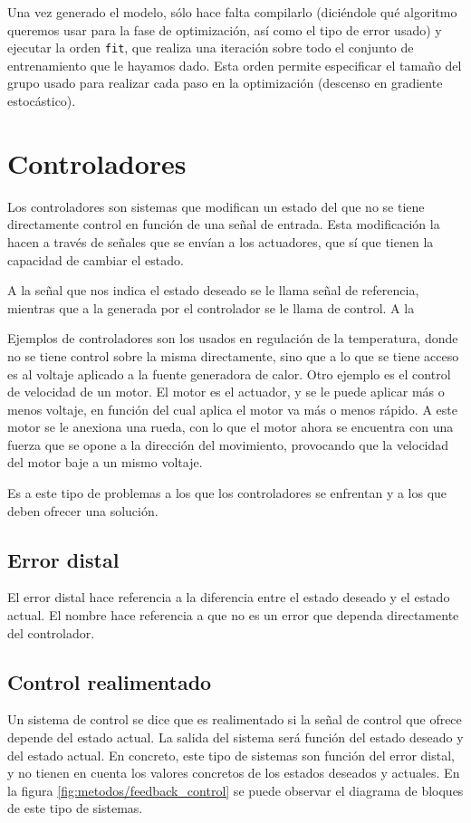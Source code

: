 Una vez generado el modelo, sólo hace falta compilarlo (diciéndole qué algoritmo queremos usar para la fase de optimización, así como el tipo de error usado) y ejecutar la orden \texttt{fit}, que realiza una iteración sobre todo el conjunto de entrenamiento que le hayamos dado. Esta orden permite especificar el tamaño del grupo usado para realizar cada paso en la optimización (descenso en gradiente estocástico).
\section{Controladores}
Los controladores \cite{kulakowski2007dynamic}\cite{brosilow2002techniques}\cite{tolu2013adaptive}\cite{tolu2012bio} son sistemas que modifican un estado del que no se tiene directamente control en función de una señal de entrada. Esta modificación la hacen a través de señales que se envían a los actuadores, que sí que tienen la capacidad de cambiar el estado.

A la señal que nos indica el estado deseado se le llama señal de referencia, mientras que a la generada por el controlador se le llama de control. A la 

Ejemplos de controladores son los usados en regulación de la temperatura, donde no se tiene control sobre la misma directamente, sino que a lo que se tiene acceso es al voltaje aplicado a la fuente generadora de calor. Otro ejemplo es el control de velocidad de un motor. El motor es el actuador, y se le puede aplicar más o menos voltaje, en función del cual aplica el motor va más o menos rápido. A este motor se le anexiona una rueda, con lo que el motor ahora se encuentra con una fuerza que se opone a la dirección del movimiento, provocando que la velocidad del motor baje a un mismo voltaje.

Es a este tipo de problemas a los que los controladores se enfrentan y a los que deben ofrecer una solución.

\subsection{Error distal}
El error distal hace referencia a la diferencia entre el estado deseado y el estado actual. El nombre hace referencia a que no es un error que dependa directamente del controlador.
\subsection{Control realimentado}
Un sistema de control se dice que es realimentado si la señal de control que ofrece depende del estado actual. La salida del sistema será función del estado deseado y del estado actual. En concreto, este tipo de sistemas son función del error distal, y no tienen en cuenta los valores concretos de los estados deseados y actuales. En la figura \ref{fig:metodos/feedback_control} se puede observar el diagrama de bloques de este tipo de sistemas.

